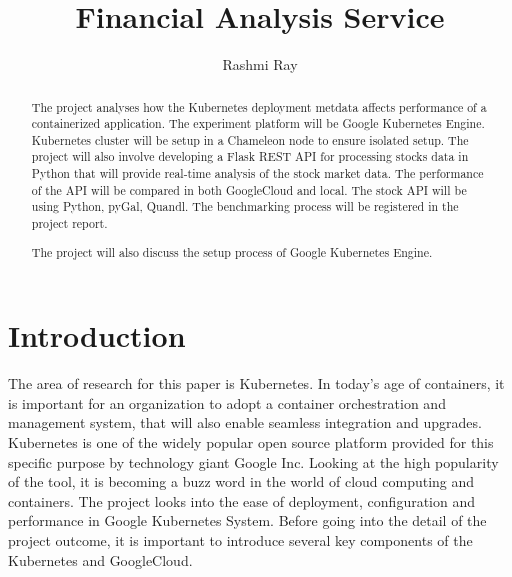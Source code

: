 
\title{Financial Analysis Service}

\author{Rashmi Ray}

\renewcommand{\shortauthors}{Rashmi Ray}

\begin{abstract}
  The project analyses how the Kubernetes deployment metdata affects
  performance of a containerized application. The experiment platform will be
  Google Kubernetes Engine. Kubernetes cluster will be setup in a Chameleon
  node to ensure isolated setup. The project will also involve developing a
  Flask REST API for processing stocks data in Python that will provide
  real-time analysis of the stock market data. The performance of the API will
  be compared in both GoogleCloud and local. The stock API will be using
  Python, pyGal, Quandl. The benchmarking process will be registered in the
  project report. 
  
  The project will also discuss the setup process of Google Kubernetes Engine.
   

\end{abstract}



\maketitle

\section{Introduction}

The area of research for this paper is Kubernetes. In today's age of
containers, it is important for an organization to adopt a container
orchestration and management system, that will also enable seamless
integration and upgrades. Kubernetes is one of the widely popular open source
platform provided for this specific purpose by technology giant Google Inc.
Looking at the high popularity of the tool, it is becoming a buzz word in the
world of cloud computing and containers. The project looks into the ease of
deployment, configuration and performance in Google Kubernetes System. Before
going into the detail of the project outcome, it is important to introduce
several key components of the Kubernetes and GoogleCloud.

